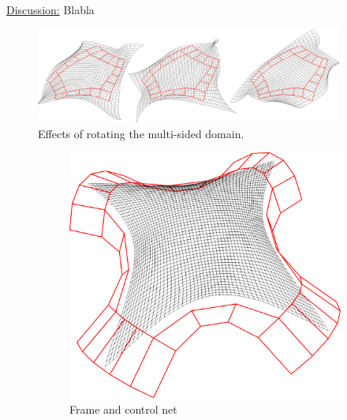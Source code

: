 \documentclass{article}
\begin{document}
\vspace{10pt}
\noindent\underline{Discussion:}\vspace{0.2em}\newline
Blabla
\begin{figure}[h!]
  \centering
  \includegraphics[width = 0.9\textwidth]{images/rotations.png}
  \caption{Effects of rotating the multi-sided domain.}
  \label{fig:rotations}
\end{figure}
\begin{figure}[h!]
  \centering
  \begin{subfigure}{0.3\textwidth}
    \includegraphics[width = \textwidth]{images/8sided-cnet.png}
    \caption{Frame and control net}
    \label{fig:8sided-cnet}
  \end{subfigure}
  \hspace{3cm}
  \begin{subfigure}{0.3\textwidth}

\end{subfigure}
\end{figure}
\end{document}
